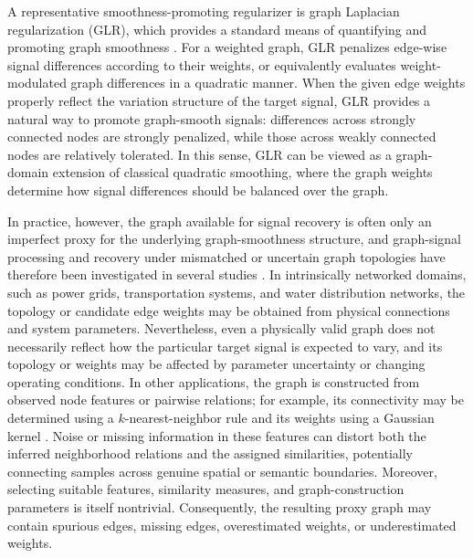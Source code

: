 A representative smoothness-promoting regularizer is graph Laplacian regularization (GLR), which provides a standard means of quantifying and promoting graph smoothness \cite{merris1994laplacian,ando2006learning,pang2017graph}.
For a weighted graph, GLR penalizes edge-wise signal differences according to their weights, or equivalently evaluates weight-modulated graph differences in a quadratic manner.
When the given edge weights properly reflect the variation structure of the target signal, GLR provides a natural way to promote graph-smooth signals: differences across strongly connected nodes are strongly penalized, while those across weakly connected nodes are relatively tolerated.
In this sense, GLR can be viewed as a graph-domain extension of classical quadratic smoothing, where the graph weights determine how signal differences should be balanced over the graph.

In practice, however, the graph available for signal recovery is often only an imperfect proxy for the underlying graph-smoothness structure, and graph-signal processing and recovery under mismatched or uncertain graph topologies have therefore been investigated in several studies \cite{miettinen2019robust,ceci2020topology,isufi2017randomgraphs,kenlay2020stability,ji2023probability,rey2023robust}.
In intrinsically networked domains, such as power grids, transportation systems, and water distribution networks, the topology or candidate edge weights may be obtained from physical connections and system parameters.
Nevertheless, even a physically valid graph does not necessarily reflect how the particular target signal is expected to vary, and its topology or weights may be affected by parameter uncertainty or changing operating conditions.
In other applications, the graph is constructed from observed node features or pairwise relations; for example, its connectivity may be determined using a $k$-nearest-neighbor rule and its weights using a Gaussian kernel \cite{belkin2003laplacian,zelnikManor2004selfTuning}.  
Noise or missing information in these features can distort both the inferred neighborhood relations and the assigned similarities, potentially connecting samples across genuine spatial or semantic boundaries.
Moreover, selecting suitable features, similarity measures, and graph-construction parameters is itself nontrivial.
Consequently, the resulting proxy graph may contain spurious edges, missing edges, overestimated weights, or underestimated weights.

